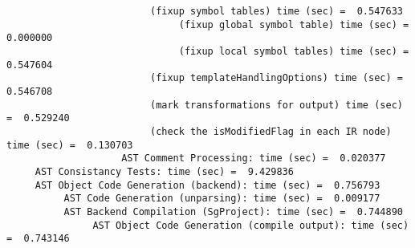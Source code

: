 {\begin{verbatim}
                         (fixup symbol tables) time (sec) =  0.547633
                              (fixup global symbol table) time (sec) =  0.000000
                              (fixup local symbol tables) time (sec) =  0.547604
                         (fixup templateHandlingOptions) time (sec) =  0.546708
                         (mark transformations for output) time (sec) =  0.529240
                         (check the isModifiedFlag in each IR node) time (sec) =  0.130703
                    AST Comment Processing: time (sec) =  0.020377
     AST Consistancy Tests: time (sec) =  9.429836
     AST Object Code Generation (backend): time (sec) =  0.756793
          AST Code Generation (unparsing): time (sec) =  0.009177
          AST Backend Compilation (SgProject): time (sec) =  0.744890
               AST Object Code Generation (compile output): time (sec) =  0.743146
\end{verbatim}
}
